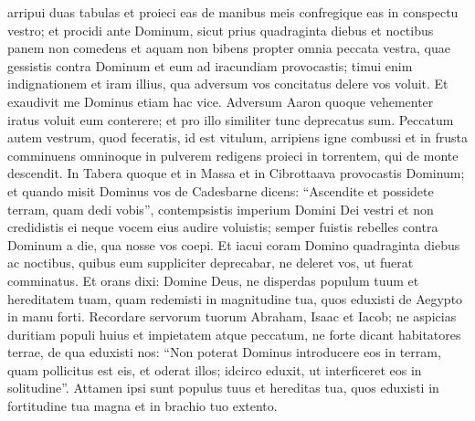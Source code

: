 \begin{biblechapter}
\begin{biblechapter}
\begin{biblechapter}
\begin{biblechapter}
\begin{biblechapter}
\begin{biblechapter}
\begin{biblechapter}
\begin{biblechapter}
\begin{biblechapter}
\verse arripui duas tabulas et proieci eas de manibus meis confregique eas in conspectu vestro; 
\verse et procidi ante Dominum, sicut prius quadraginta diebus et noctibus panem non comedens et aquam non bibens propter omnia peccata vestra, quae gessistis contra Dominum et eum ad iracundiam provocastis; 
\verse timui enim indignationem et iram illius, qua adversum vos concitatus delere vos voluit. Et exaudivit me Dominus etiam hac vice. 
\verse Adversum Aaron quoque vehementer iratus voluit eum conterere; et pro illo similiter tunc deprecatus sum. 
\verse Peccatum autem vestrum, quod feceratis, id est vitulum, arripiens igne combussi et in frusta comminuens omninoque in pulverem redigens proieci in torrentem, qui de monte descendit.
 \verse In Tabera quoque et in Massa et in Cibrottaava provocastis Dominum; 
\verse et quando misit Dominus vos de Cadesbarne dicens: “Ascendite et possidete terram, quam dedi vobis”, contempsistis imperium Domini Dei vestri et non credidistis ei neque vocem eius audire voluistis; 
\verse semper fuistis rebelles contra Dominum a die, qua nosse vos coepi.
 \verse Et iacui coram Domino quadraginta diebus ac noctibus, quibus eum suppliciter deprecabar, ne deleret vos, ut fuerat comminatus. 
\verse Et orans dixi: Domine Deus, ne disperdas populum tuum et hereditatem tuam, quam redemisti in magnitudine tua, quos eduxisti de Aegypto in manu forti. 
\verse Recordare servorum tuorum Abraham, Isaac et Iacob; ne aspicias duritiam populi huius et impietatem atque peccatum, 
\verse ne forte dicant habitatores terrae, de qua eduxisti nos: “Non poterat Dominus introducere eos in terram, quam pollicitus est eis, et oderat illos; idcirco eduxit, ut interficeret eos in solitudine”. 
 \verse Attamen ipsi sunt populus tuus et hereditas tua, quos eduxisti in fortitudine tua magna et in brachio tuo extento.
 

\end{biblechapter}
\end{biblechapter}
\end{biblechapter}
\end{biblechapter}
\end{biblechapter}
\end{biblechapter}
\end{biblechapter}
\end{biblechapter}
\end{biblechapter}
